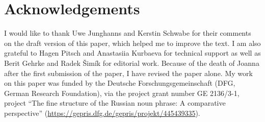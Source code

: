 \documentclass[output=paper,colorlinks,citecolor=brown,
]{langscibook}
\begin{document}

\section*{Acknowledgements}

I would like to thank Uwe Junghanns and Kerstin Schwabe for their comments on the draft version of this paper, which helped me to improve the text. I am also grateful to Hagen Pitsch and Anastasiia Kurbaeva for technical support as well as Berit Gehrke and Radek Šimík for editorial work. Because of the death of Joanna after the first submission of the paper, I have revised the paper alone. My work on this paper was funded by the Deutsche Forschungsgemeinschaft (DFG, German Research Foundation), via the project grant number GE 2136/3-1, project ``The fine structure of the Russian noun phrase: A comparative perspective'' (\url{https://gepris.dfg.de/gepris/projekt/445439335}).


\sloppy
\printbibliography[heading=subbibliography,notkeyword=this]


\end{document}

